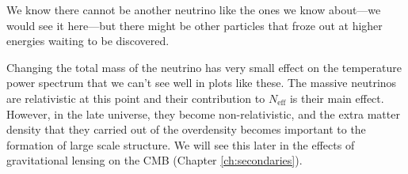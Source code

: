 We know there cannot be another neutrino like the ones we know about---we would see it here---but there might be other particles that froze out at higher energies waiting to be discovered.

Changing the total mass of the neutrino has very small effect on the temperature power spectrum that we can't see well in plots like these.  The massive neutrinos are relativistic at this point and their contribution to $N_\textrm{eff}$ is their main effect.  However, in the late universe, they become non-relativistic, and the extra matter density that they carried out of the overdensity becomes important to the formation of large scale structure.  We will see this later in the effects of gravitational lensing on the CMB (Chapter \ref{ch:secondaries}).





\exercises


